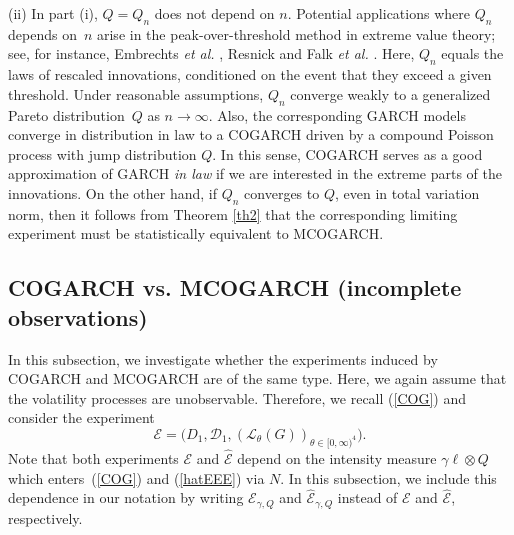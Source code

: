 \documentclass[number,citesort,seceqn,dvips]{arxbj}
\newcommand{\eqref}[1]{(\ref{#1})}
\newcommand{\DDD}{{\mathcal D}}
\newcommand{\EEE}{{\mathcal E}}
\newcommand{\LLL}{{\mathcal L}}
\begin{document}
\begin{remark}
(ii)   In part (i), $Q=Q_n$ does not depend on $n$. Potential
applications where $Q_n$ depends on~$n$ arise in the
peak-over-threshold method in extreme value theory; see, for instance,
Embrechts \textit{et al.} \cite{EK97}, Resnick \cite{Re87} and
Falk \textit{et al.} \cite{FHR00}. Here, $Q_n$ equals the laws of
rescaled innovations, conditioned on the event that they exceed a given
threshold. Under reasonable assumptions, $Q_n$ converge weakly to a
generalized Pareto distribution~$Q$ as $n\to\infty$. Also, the
corresponding GARCH models converge in distribution in law to a COGARCH
driven by a compound Poisson process with jump distribution $Q$. In
this sense, COGARCH serves as a good approximation of GARCH \textit{in
law} if we are interested in the extreme parts of the innovations. On
the other hand, if $Q_n$ converges to $Q$, even in total variation
norm, then it follows from Theorem \ref{th2} that the corresponding
limiting experiment must be statistically equivalent to MCOGARCH.
\end{remark}

\subsection{COGARCH vs. MCOGARCH (incomplete
observations)}\label{secIncompletecomparison}
In this subsection, we
investigate whether the experiments induced by COGARCH and MCOGARCH are
of the same type. Here, we again assume that the volatility processes
are unobservable. Therefore, we recall \eqref{COG} and consider the
experiment
%
\begin{equation}\label{COGARCHexperiments}
\EEE =  \bigl(D_1,\DDD_1, (\LLL_{\theta}(G) )_{\theta\in
[0,\infty)^4} \bigr) .
\end{equation}
%
Note that both experiments $\EEE$ and $\widehat\EEE$ depend on the
intensity measure $\gamma\ell\otimes Q$ which enters~\eqref{COG} and
\eqref{hatEEE} via $N$. In this subsection, we include this dependence
in our notation by writing $\EEE_{\gamma,Q}$ and
$\widehat\EEE_{\gamma,Q}$ instead of $\EEE$ and $\widehat\EEE$,
respectively.
\end{document}
